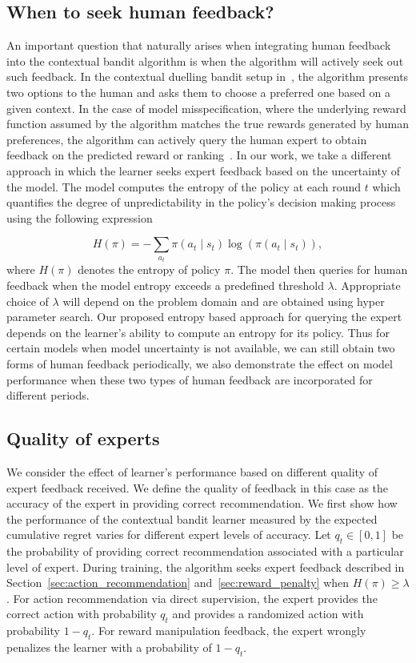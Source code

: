 \subsection{When to seek human feedback?}
\label{subsec:when_to_seek_hf}
An important question that naturally arises when integrating human feedback into the contextual bandit algorithm is when the algorithm will actively seek out such feedback. In the contextual duelling bandit setup in~\citep{di2024nearly}, the algorithm presents two options to the human and asks them to choose a preferred one based on a given context. In the case of model misspecification, where the underlying reward function assumed by the algorithm matches the true rewards generated by human preferences, the algorithm can actively query the human expert to obtain feedback on the predicted reward or ranking~\citep{yang2023contextual}. In our work, we take a different approach in which the learner seeks expert feedback based on the uncertainty of the model. The model computes the entropy of the policy at each round $t$ which quantifies the degree of unpredictability in the policy's decision making process using the following expression 

\begin{equation}
H(\pi)=-\sum_{a_t}\pi(a_t\mid s_t)\log(\pi(a_t\mid s_t)),
\label{eq:policy_entropy}
\end{equation}
where $H(\pi)$ denotes the entropy of policy $\pi$. The model then queries for human feedback when the model entropy exceeds a predefined threshold $\lambda$. Appropriate choice of $\lambda$ will depend on the problem domain and are obtained using hyper parameter search. Our proposed entropy based approach for querying the expert depends on the learner's ability to compute an entropy for its policy. Thus for certain models when model uncertainty is not available, we can still obtain two forms of human feedback periodically, we also demonstrate the effect on model performance when these two types of human feedback are incorporated for different periods. 
\subsection{Quality of experts}
\label{subsec:exp_quality}
We consider the effect of learner's performance based on different quality of expert feedback received. We define the quality of feedback in this case as the accuracy of the expert in providing correct recommendation. We first show how the performance of the contextual bandit learner measured by the expected cumulative regret varies for different expert levels of accuracy. Let $q_t\in [0,1]$ be the probability of providing correct recommendation associated with a particular level of expert. During training, the algorithm seeks expert feedback described in Section~\ref{sec:action_recommendation} and~\ref{sec:reward_penalty} when $H(\pi)\geq \lambda$. For action recommendation via direct supervision, the expert provides the correct action with probability $q_t$ and provides a randomized action with probability $1-q_t$. For reward manipulation feedback, the expert wrongly penalizes the learner with a probability of $1-q_t$. 






\bigskip



